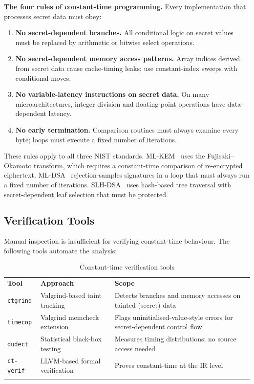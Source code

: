 \begin{svgraybox}
\textbf{The four rules of constant-time programming.}
Every implementation that processes secret data must obey:
\begin{enumerate}
\item \textbf{No secret-dependent branches.}  All conditional logic on secret values must be replaced by arithmetic or bitwise select operations.
\item \textbf{No secret-dependent memory access patterns.}  Array indices derived from secret data cause cache-timing leaks; use constant-index sweeps with conditional moves.
\item \textbf{No variable-latency instructions on secret data.}  On many microarchitectures, integer division and floating-point operations have data-dependent latency.
\item \textbf{No early termination.}  Comparison routines must always examine every byte; loops must execute a fixed number of iterations.
\end{enumerate}
\end{svgraybox}

These rules apply to all three NIST standards.  ML-KEM~\cite{FIPS203} uses the Fujisaki--Okamoto transform, which requires a constant-time comparison of re-encrypted ciphertext.  ML-DSA~\cite{FIPS204} rejection-samples signatures in a loop that must always run a fixed number of iterations.  SLH-DSA~\cite{FIPS205} uses hash-based tree traversal with secret-dependent leaf selection that must be protected.

\subsection{Verification Tools}
\label{subsec:ct-tools}

Manual inspection is insufficient for verifying constant-time behaviour.  The following tools automate the analysis:

\begin{table}[t]
\caption{Constant-time verification tools}
\label{tab:ct-tools}
\begin{tabular}{p{2.5cm}p{3.5cm}p{5cm}}
\hline\noalign{\smallskip}
\textbf{Tool} & \textbf{Approach} & \textbf{Scope} \\
\noalign{\smallskip}\svhline\noalign{\smallskip}
\texttt{ctgrind}  & Valgrind-based taint tracking  & Detects branches and memory accesses on tainted (secret) data \\
\texttt{timecop}  & Valgrind memcheck extension     & Flags uninitialised-value-style errors for secret-dependent control flow \\
\texttt{dudect}   & Statistical black-box testing   & Measures timing distributions; no source access needed \\
\texttt{ct-verif} & LLVM-based formal verification  & Proves constant-time at the IR level \\
\noalign{\smallskip}\hline
\end{tabular}
\end{table}

